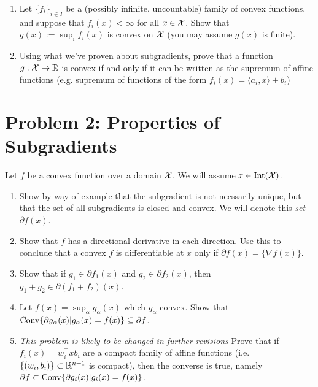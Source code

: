 \documentclass[12pt]{article}
\begin{document}
\begin{enumerate}
\item
Let $\{f_{i}\}_{i \in I}$ be a (possibly infinite, uncountable) family of convex functions, and suppose that $f_{i}(x) < \infty$ for all $x \in {\cal X}$. Show that $g(x) := \sup_{i} f_{i}(x)$ is convex on ${\cal X}$ (you may assume $g(x)$ is finite).

\item
Using what we've proven about subgradients, prove that a function $g: {\cal X} \to \mathbb{R}$ is convex if and only if it can be written as the supremum of affine functions (e.g. supremum of functions of the form $f_i(x) = \langle a_{i}, x \rangle + b_{i}$)
\end{enumerate}

\section*{Problem 2: Properties of Subgradients}
Let $f$ be a convex function over a domain ${\cal X}$. We will assume $x \in \mathrm{Int}({\cal X})$. 
\begin{enumerate}
\item
Show by way of example that the subgradient is not necssarily unique, but that the set of all subgradients is closed and convex. We will denote this \emph{set} $\partial f(x)$.
\item Show that $f$ has a directional derivative in each direction. Use this to conclude that a convex $f$ is differentiable at $x$ only if $\partial f(x) = \{\nabla f(x)\}$.
\item
Show that if $g_1 \in \partial f_1(x)$ and $g_2 \in \partial f_2(x)$, then $g_1 + g_2 \in \partial(f_1 + f_2)(x)$. 
\item
Let $f(x) = \sup_{\alpha} g_{\alpha}(x)$ which $g_{\alpha}$ convex. Show that $\mathrm{Conv} \{\partial g_{\alpha}(x) |  g_{\alpha}(x) =f(x) \} \subseteq \partial f$. 
\item \emph{This problem is likely to be changed in further revisions} Prove that if $f_{i}(x) = w_{i}^\top x
b_{i}$ are a compact family of affine functions (i.e.
$\{(w_{i},b_{i})\} \subset \mathbb{R}^{n+1}$ is compact), then the converse is true, namely $\partial f \subset \mathrm{Conv} \{\partial g_{i}(x) |  g_{i}(x) =f(x) \} $. 
\end{enumerate}
\end{document}
